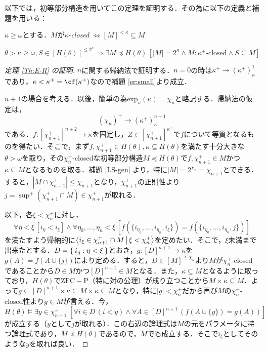 \documentclass[a4paper]{bxjsarticle}
\begin{document}
以下では，初等部分構造を用いてこの定理を証明する．その為に以下の定義と補題を用いる：

\begin{definition}
 $\kappa \geq \omega$とする．$M$が$\kappa$-{\itshape closed} $\Leftrightarrow [M]^{<\kappa} \subseteq M$
\end{definition}

\begin{lemma}\label{LS-gen}
 $\theta > \kappa \geq \omega, S \in [H(\theta)]^{\leq 2^\kappa}
   \Longrightarrow \exists M \preccurlyeq H(\theta) \, [ |M| = 2^\kappa \wedge M: \kappa^+\text{-closed} \wedge S \subseteq M]$
\end{lemma}

\begin{proof}[定理 \ref{Th:E-R} の証明]
 $n$に関する帰納法で証明する．$n = 0$の時は$\kappa^+ \longrightarrow (\kappa^+)^1_\kappa$であり，$\kappa < \kappa^+ = \cf(\kappa^+)$なので補題 \ref{er:small}より成立．

$n+1$の場合を考える．以後，簡単の為$\mathrm{exp}_n(\kappa) = \chi_n$と略記する．帰納法の仮定は，
\[
 (\chi_n)^+ \longrightarrow (\kappa^+)^{n+1}_\kappa
\]
である．$f: [\chi_{n+1}^+]^{n+2} \longrightarrow \kappa$を固定し，$Z \in [\chi_{n+1}^+]^{\kappa^+}$で$f$について等質となるものを得たい．そこで，まず$f, \chi_{n+1}^+ \in H(\theta), \kappa \subseteq H(\theta)$を満たす十分大きな$\theta > \omega$を取り，その$\chi_n^+$-closedな初等部分構造$M \preccurlyeq H(\theta)$で$f, \chi_{n+1}^+ \in M$かつ$\kappa \subseteq M$となるものを取る．補題 \ref{LS-gen} より，特に$|M| = 2^{\chi_n} = \chi_{n+1}$とできる．すると，$|M \cap \chi_{n+1}^+| \leq \chi_{n+1}$となり，$\chi_{n+1}^+$の正則性より$j = \sup^+(\chi_{n+1}^+ \cap M) \in \chi_{n+1}^+$が取れる．

 以下，各$\xi < \chi_{n}^+$に対し，
 \[
  \forall \eta < \xi \, [ i_\eta < i_\xi] \wedge \forall \eta_0, \dots, \eta_n < \xi \, [f(\{i_{\eta_0}, \dots, i_{\eta_n}, i_\xi\}) = f(\{i_{\eta_0}, \dots, i_{\eta_n}, j\})]
 \]
 を満たすよう帰納的に$\Braket{i_\xi \in \chi_{n+1}^+ \cap M | \xi < \chi_n^+}$を定めたい．そこで，$\xi$未満まで出来たとする．$D = \Set{ i_\eta : \eta < \xi}$とおき，$g : [D]^{n+1} \rightarrow \kappa$を$g(A) = f(A \cup \{j\})$により定める．すると，$D \in [M]^{\leq \chi_n}$より$M$が$\chi_n^+$-closedであることから$D \in M$かつ$[D]^{n+1} \in M$となる．また，$\kappa \subseteq M$となるように取っており，$H(\theta)$で$\mathrm{ZFC}-\mathrm{P}$（特に対の公理）が成り立つことから$M \times \kappa \subseteq M$．よって$g \subseteq [D]^{n+1} \times \kappa \subseteq M \times \kappa \subseteq M$となり，特に$|g| < \chi_n^+$だから再び$M$の$\chi_n^+$-closed性より$g \in M$が言える．今，
 \[
  H(\theta) \models
 \exists y \in \chi_{n+1}^+\;\left[ \forall i \in D\, (i < y) \wedge \forall A \in [D]^{n+1}\, (f(A \cup \{y\}) = g(A))\right]
 \]
 が成立する（$y$として$j$が取れる）．この右辺の論理式は$M$の元をパラメータに持つ論理式であり，$M \preccurlyeq H(\theta)$であるので，$M$でも成立する．そこで$i_\xi$としてそのような$y$を取れば良い．


\end{proof}
\end{document}
